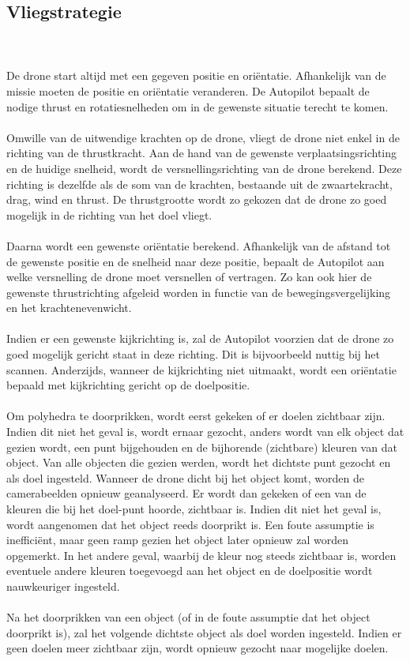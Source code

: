 \subsection{Vliegstrategie}
\\
\\
De drone start altijd met een gegeven positie en ori\"entatie. Afhankelijk van de missie moeten de positie en ori\"entatie veranderen. De Autopilot bepaalt de nodige thrust en rotatiesnelheden om in de gewenste situatie terecht te komen. 
\\
\\
Omwille van de uitwendige krachten op de drone, vliegt de drone niet enkel in de richting van de thrustkracht. Aan de hand van de gewenste verplaatsingsrichting en de huidige snelheid, wordt de versnellingsrichting van de drone berekend. Deze richting is dezelfde als de som van de krachten, bestaande uit de zwaartekracht, drag, wind en thrust. De thrustgrootte wordt zo gekozen dat de drone zo goed mogelijk in de richting van het doel vliegt.
\\
\\
Daarna wordt een gewenste ori\"entatie berekend. Afhankelijk van de afstand tot de gewenste positie en de snelheid naar deze positie, bepaalt de Autopilot aan welke versnelling de drone moet versnellen of vertragen. Zo kan ook hier de gewenste thrustrichting afgeleid worden in functie van de bewegingsvergelijking en het krachtenevenwicht.
\\
\\
\noindent
Indien er een gewenste kijkrichting is, zal de Autopilot voorzien dat de drone zo goed mogelijk gericht staat in deze richting. Dit is bijvoorbeeld nuttig bij het scannen. Anderzijds, wanneer de kijkrichting niet uitmaakt, wordt een ori\"entatie bepaald met kijkrichting gericht op de doelpositie.\\
\\
\noindent
Om polyhedra te doorprikken, wordt eerst gekeken of er doelen zichtbaar zijn. Indien dit niet het geval is, wordt ernaar gezocht, anders wordt van elk object dat gezien wordt, een punt bijgehouden en de bijhorende (zichtbare) kleuren van dat object. Van alle objecten die gezien werden, wordt het dichtste punt gezocht en als doel ingesteld. Wanneer de drone dicht bij het object komt, worden de camerabeelden opnieuw geanalyseerd. Er wordt dan gekeken of een van de kleuren die bij het doel-punt hoorde, zichtbaar is. Indien dit niet het geval is, wordt aangenomen dat het object reeds doorprikt is. Een foute assumptie is ineffici\"ent, maar geen ramp gezien het object later opnieuw zal worden opgemerkt. In het andere geval, waarbij de kleur nog steeds zichtbaar is, worden eventuele andere kleuren toegevoegd aan het object en de doelpositie wordt nauwkeuriger ingesteld. \\
\\
\noindent
Na het doorprikken van een object (of in de foute assumptie dat het object doorprikt is), zal het volgende dichtste object als doel worden ingesteld. Indien er geen doelen meer zichtbaar zijn, wordt opnieuw gezocht naar mogelijke doelen. %